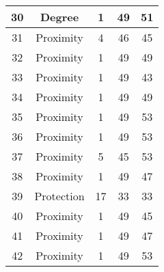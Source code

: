 \documentclass[results.tex]{subfiles}
\begin{document}
\begin{center}
\begin{tabular}{| c || c | c | c | c |}
            \hline
            30                      & Degree                       & 1                      & 49                      & 51                   \\
            \hline
            31                      & Proximity                    & 4                      & 46                      & 45                   \\
            \hline
            32                      & Proximity                    & 1                      & 49                      & 49                   \\
            \hline
            33                      & Proximity                    & 1                      & 49                      & 43                   \\
            \hline
            34                      & Proximity                    & 1                      & 49                      & 49                   \\
            \hline
            35                      & Proximity                    & 1                      & 49                      & 53                   \\
            \hline
            36                      & Proximity                    & 1                      & 49                      & 53                   \\
            \hline
            37                      & Proximity                    & 5                      & 45                      & 53                   \\
            \hline
            38                      & Proximity                    & 1                      & 49                      & 47                   \\
            \hline
            39                      & Protection                   & 17                     & 33                      & 33                   \\
            \hline
            40                      & Proximity                    & 1                      & 49                      & 45                   \\
            \hline
            41                      & Proximity                    & 1                      & 49                      & 47                   \\
            \hline
            42                      & Proximity                    & 1                      & 49                      & 53                   \\

\end{tabular}
\end{center}
\end{document}
